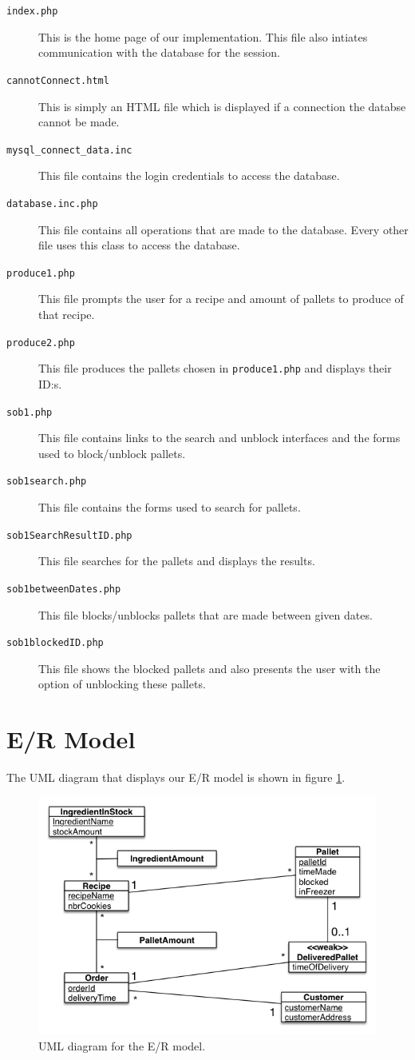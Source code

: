 \documentclass[a4paper]{article}
\begin{document}
\begin{description}
\item[\texttt{index.php}] This is the home page of our implementation. This file also intiates communication with the database for the session.
\item[\texttt{cannotConnect.html}] This is simply an HTML file which is displayed if a connection the databse cannot be made.
\item[\texttt{mysql\_connect\_data.inc}] This file contains the login credentials to access the database.
\item[\texttt{database.inc.php}] This file contains all operations that are made to the database. Every other file uses this class to access the database.
\item[\texttt{produce1.php}] This file prompts the user for a recipe and amount of pallets to produce of that recipe.
\item[\texttt{produce2.php}] This file produces the pallets chosen in \texttt{produce1.php} and displays their ID:s.
\item[\texttt{sob1.php}] This file contains links to the search and unblock interfaces and the forms used to block/unblock pallets.
\item[\texttt{sob1search.php}] This file contains the forms used to search for pallets. 
\item[\texttt{sob1SearchResultID.php}] This file searches for the pallets and displays the results.
\item[\texttt{sob1betweenDates.php}] This file blocks/unblocks pallets that are made between given dates.
\item[\texttt{sob1blockedID.php}] This file shows the blocked pallets and also presents the user with the option of unblocking these pallets.
\end{description}
\section{E/R Model}
The UML diagram that displays our E/R model is shown in figure \ref{uml}.

\begin{figure}[t]
\centering
\includegraphics[scale=0.7]{projectUMLFinal.png}
\caption{UML diagram for the E/R model.}
\label{uml}
\end{figure}
\end{document}
